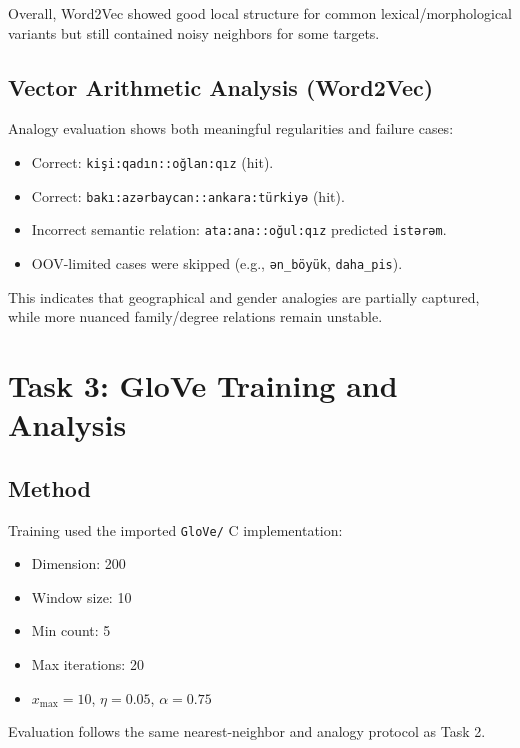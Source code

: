 \documentclass[11pt]{article}
\begin{document}
Overall, Word2Vec showed good local structure for common lexical/morphological variants but still contained noisy neighbors for some targets.

\subsection{Vector Arithmetic Analysis (Word2Vec)}
Analogy evaluation shows both meaningful regularities and failure cases:
\begin{itemize}
    \item Correct: \texttt{kişi:qadın::oğlan:qız} (hit).
    \item Correct: \texttt{bakı:azərbaycan::ankara:türkiyə} (hit).
    \item Incorrect semantic relation: \texttt{ata:ana::oğul:qız} predicted \texttt{istərəm}.
    \item OOV-limited cases were skipped (e.g., \texttt{ən\_böyük}, \texttt{daha\_pis}).
\end{itemize}
This indicates that geographical and gender analogies are partially captured, while more nuanced family/degree relations remain unstable.

\section{Task 3: GloVe Training and Analysis}
\subsection{Method}
Training used the imported \texttt{GloVe/} C implementation:
\begin{itemize}
    \item Dimension: 200
    \item Window size: 10
    \item Min count: 5
    \item Max iterations: 20
    \item \(x_{\max}=10\), \(\eta=0.05\), \(\alpha=0.75\)
\end{itemize}

Evaluation follows the same nearest-neighbor and analogy protocol as Task 2.
\end{document}
